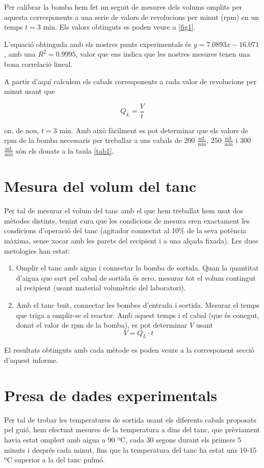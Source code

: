 \documentclass[10pt, twoside]{article}
\begin{document}
Per calibrar la bomba hem fet un seguit de mesures dels volums omplits per aquesta corresponents a una serie de valors de revolucions per minut (rpm) en un temps $t = 3$ min. Els valors obtinguts es poden veure a \ref{fig1}.

L'equació obtinguda amb els nostres punts experimentals és $y=7.0893x-16.071$, amb una $R^2 = 0.9995$, valor que ens indica que les nostres mesures tenen una bona correlació lineal.

A partir d'aquí calculem els cabals corresponents a cada valor de revolucions per minut usant que

\begin{equation}
    Q_L = \frac{V}{t}
\end{equation}

on, de nou, $t=3$ min. Amb això fàcilment es pot determinar que els valors de rpm de la bomba necessaris per treballar a uns cabals de 200 $\frac{\text{mL}}{\text{min}}$, 250 $\frac{\text{mL}}{\text{min}}$ i 300 $\frac{\text{mL}}{\text{min}}$ són els donats a la taula \ref{tab1}.

\section{Mesura del volum del tanc}
Per tal de mesurar el volum del tanc amb el que hem treballat hem usat dos mètodes distints, tenint cura que les condicions de mesura eren exactament les condicions d'operació del tanc (agitador connectat al 10$\%$ de la seva potència màxima, sense xocar amb les parets del recipient i a una alçada fixada). Les dues metologies han estat:
\begin{enumerate}
    \item Omplir el tanc amb aigua i connectar la bomba de sortida. Quan la quantitat d'aigua que surt pel cabal de sortida és zero, mesurar tot el volum contingut al recipient (usant material volumètric del laboratori).
    \item Amb el tanc buit, connectar les bombes d'entrada i sortida. Mesurar el temps que triga a omplir-se el reactor. Amb aquest temps i el cabal (que és conegut, donat el valor de rpm de la bomba), es pot determinar $V$ usant
    \begin{equation}
        V = Q_L \cdot t
    \end{equation}
\end{enumerate}
El resultats obtinguts amb cada mètode es poden veure a la corresponent secció d'aquest informe.

\section{Presa de dades experimentals}
Per tal de trobar les temperatures de sortida usant els diferents cabals proposats pel guió, hem efectuat mesures de la temperatura a dins del tanc, que prèviament havia estat omplert amb aigua a 90 ºC, cada 30 segons durant els primers 5 minuts i després cada minut, fins que la temperatura del tanc ha estat uns 10-15 ºC superior a la del tanc pulmó.
\end{document}
